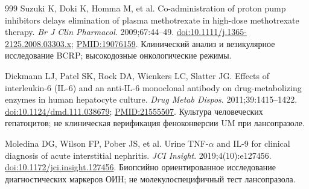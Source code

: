 \documentclass[11pt,a4paper,notitlepage]{report}
\begin{document}
\begin{thebibliography}{999}
 Suzuki K, Doki K, Homma M, et al. Co-administration of proton pump inhibitors delays elimination of plasma methotrexate in high-dose methotrexate therapy. \textit{Br J Clin Pharmacol}. 2009;67:44--49. \href{https://doi.org/10.1111/j.1365-2125.2008.03303.x}{doi:10.1111/j.1365-2125.2008.03303.x}; \href{https://pubmed.ncbi.nlm.nih.gov/19076159/}{PMID:19076159}. Клинический анализ и везикулярное исследование BCRP; высокодозные онкологические режимы.

 Dickmann LJ, Patel SK, Rock DA, Wienkers LC, Slatter JG. Effects of interleukin-6 (IL-6) and an anti-IL-6 monoclonal antibody on drug-metabolizing enzymes in human hepatocyte culture. \textit{Drug Metab Dispos}. 2011;39:1415--1422. \href{https://doi.org/10.1124/dmd.111.038679}{doi:10.1124/dmd.111.038679}; \href{https://pubmed.ncbi.nlm.nih.gov/21555507/}{PMID:21555507}. Культура человеческих гепатоцитов; не клиническая верификация феноконверсии UM при лансопразоле.

 Moledina DG, Wilson FP, Pober JS, et al. Urine TNF-$\alpha$ and IL-9 for clinical diagnosis of acute interstitial nephritis. \textit{JCI Insight}. 2019;4(10):e127456. \href{https://doi.org/10.1172/jci.insight.127456}{doi:10.1172/jci.insight.127456}. Биопсийно ориентированное исследование диагностических маркеров ОИН; не молекулоспецифичный тест лансопразола.

\end{thebibliography}
\end{document}
